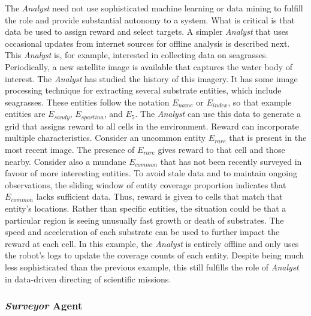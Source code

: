 \documentclass{tamuccthesis}
\begin{document}
The \textit{Analyst} need not use sophisticated machine learning or data mining to fulfill the role and provide substantial autonomy to a system. What is critical is that data be used to assign reward and select targets. A simpler \textit{Analyst} that uses occasional updates from internet sources for offline analysis is described next. This \textit{Analyst} is, for example, interested in collecting data on seagrasses. Periodically, a new satellite image is available that captures the water body of interest. The \textit{Analyst} has studied the history of this imagery. It has some image processing technique for extracting several substrate entities, which include seagrasses. These entities follow the notation $E_{name}$ or $E_{index}$, so that example entities are $E_{sandy}$, $E_{spartina}$, and $E_{5}$. The \textit{Analyst} can use this data to generate a grid that assigns reward to all cells in the environment. Reward can incorporate multiple characteristics. Consider an uncommon entity $E_{rare}$ that is present in the most recent image. The presence of $E_{rare}$ gives reward to that cell and those nearby. Consider also a mundane $E_{common}$ that has not been recently surveyed in favour of more interesting entities. To avoid stale data and to maintain ongoing observations, the sliding window of entity coverage proportion indicates that $E_{common}$ lacks sufficient data. Thus, reward is given to cells that match that entity's locations. Rather than specific entities, the situation could be that a particular region is seeing unusually fast growth or death of substrates. The speed and acceleration of each substrate can be used to further impact the reward at each cell. In this example, the \textit{Analyst} is entirely offline and only uses the robot's logs to update the coverage counts of each entity. Despite being much less sophisticated than the previous example, this still fulfills the role of \textit{Analyst} in data-driven directing of scientific missions. 

\subsubsection{\textit{Surveyor} Agent}
\end{document}

